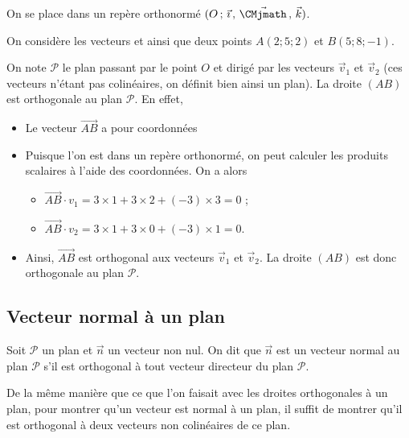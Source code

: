 \documentclass[11pt,fleqn, openany]{book} %
\begin{document}
\begin{example} On se place dans un repère orthonormé $\Oijk$. 

On considère les vecteurs \renewcommand{\arraystretch}{1} et \renewcommand{\arraystretch}{1} ainsi que deux points $A(2;5;2)$ et $B(5;8;-1)$.

On note $\mathcal{P}$ le plan passant par le point $O$ et dirigé par les vecteurs $\vec v_1$ et $\vec v_2$ (ces vecteurs n'étant pas colinéaires, on définit bien ainsi un plan). La droite $(AB)$ est orthogonale au plan $\mathcal{P}$. En effet,
\begin{itemize}
\item Le vecteur $\overrightarrow{AB}$ a pour coordonnées \renewcommand{\arraystretch}{1}
\item Puisque l'on est dans un repère orthonormé, on peut calculer les produits scalaires à l'aide des coordonnées. On a alors
\begin{itemize}
\item $\overrightarrow{AB} \cdot  v_1 = 3 \times 1 + 3 \times 2 + (-3) \times 3 = 0$ ;
\item $\overrightarrow{AB} \cdot v_2 = 3 \times 1 + 3 \times 0 + (-3) \times 1 = 0$.
\end{itemize}
\item Ainsi, $\overrightarrow{AB}$ est orthogonal aux vecteurs $\vec v_1$ et $\vec v_2$. La droite $(AB)$ est donc orthogonale au plan $\mathcal{P}$.
\end{itemize}\end{example}



\subsection{Vecteur normal à un plan}

\begin{definition}Soit $\mathcal{P}$ un plan et $\vec n$ un vecteur non nul.
On dit que $\vec n$ est un vecteur normal au plan $\mathcal{P}$ s'il est orthogonal à tout vecteur directeur du plan $\mathcal{P}$.\end{definition}

De la même manière que ce que l'on faisait avec les droites orthogonales à un plan, pour montrer qu'un vecteur est normal à un plan, il suffit de montrer qu'il est orthogonal à deux vecteurs non colinéaires de ce plan.
\end{document}
